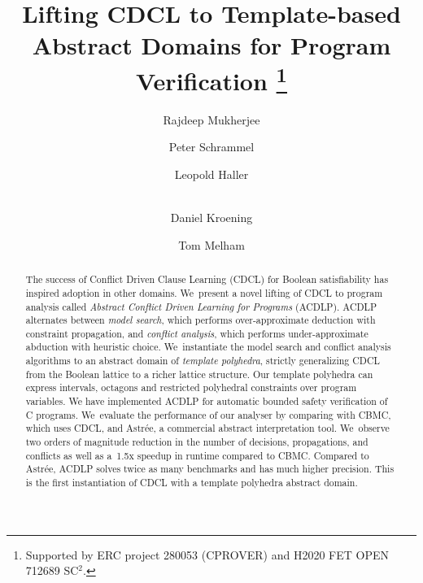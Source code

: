 \documentclass[runningheads,a4paper]{llncs}
\begin{document}
\title{Lifting CDCL to Template-based Abstract Domains
for Program Verification%
\thanks{Supported by ERC project
280053 (CPROVER) and H2020 FET OPEN 712689 SC$^2$.}}

\author{Rajdeep Mukherjee \and Peter Schrammel \and 
Leopold Haller \and \\ 
Daniel Kroening \and Tom Melham}



\maketitle

\begin{abstract}
%
The success of Conflict Driven Clause Learning (CDCL) for Boolean
satisfiability has inspired adoption in other domains.  We~present a novel
lifting of CDCL to program analysis called \emph{Abstract Conflict Driven
Learning for Programs} (ACDLP).  ACDLP alternates between \emph{model
search}, which performs over-approximate deduction with constraint
propagation, and \emph{conflict analysis}, which performs under-approximate
abduction with heuristic choice.  We~instantiate the model search and
conflict analysis algorithms to an abstract domain of \textit{template
polyhedra}, strictly generalizing CDCL from the Boolean lattice to a richer
lattice structure.  Our template polyhedra can express intervals, octagons
and restricted polyhedral constraints over program variables.  We have
implemented ACDLP for automatic bounded safety verification of C programs. 
We~evaluate the performance of our analyser by comparing with CBMC, which
uses CDCL, and Astr{\'e}e, a commercial abstract interpretation tool. 
We~observe two orders of magnitude reduction in the number of decisions,
propagations, and conflicts as well as a~1.5x speedup in runtime compared to
CBMC.  Compared to Astr{\'e}e, ACDLP solves twice as many benchmarks and has
much higher precision.  This is the first instantiation of CDCL with a
template polyhedra abstract domain.
%
\end{abstract}


\end{document}
